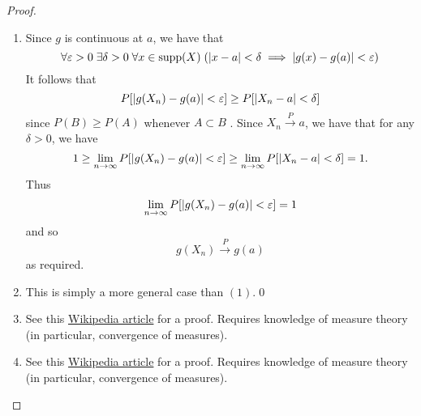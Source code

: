 \documentclass[notoc,notitlepage]{tufte-book}
\newcommand{\convp}{\overset{P}{\to}}
\begin{document}
\begin{proof}
  \begin{enumerate}
    \item Since $g$ is continuous at $a$, we have that
      \begin{equation*}
        \forall \varepsilon > 0 \; \exists \delta > 0 \; \forall x \in \operatorname{supp}(X) \; ( \left|x -a\right| < \delta \implies \left|g(x) - g(a)\right| < \varepsilon )
      \end{equation*}
      It follows that
      \begin{equation*}
        P[ \left| g(X_n ) - g(a)\right| < \varepsilon ] \geq P[ \left|X_n - a\right| < \delta ]
      \end{equation*}
      since $P(B) \geq P(A)$ whenever $A \subset B$ . Since $X_n \convp a$, we have that for any $\delta > 0$, we have
      \begin{equation*}
        1 \geq \lim_{n \to \infty} P[ \left|g(X_n) - g(a)\right| < \varepsilon ] \geq \lim_{n \to \infty} P[ \left|X_n - a\right| < \delta ] = 1.
      \end{equation*}
      Thus
      \begin{equation*}
        \lim_{n \to \infty} P[ \left|g(X_n) - g(a)\right| < \varepsilon ] = 1
      \end{equation*}
      and so
      \begin{equation*}
        g(X_n) \convp g(a)
      \end{equation*}
      as required.

    \item This is simply a more general case than $(1)$.\qed

    \item See this \href{https://en.wikipedia.org/wiki/Slutsky\'s_theorem}{Wikipedia article} for a proof. Requires knowledge of measure theory (in particular, convergence of measures).
      
    \item See this \href{https://en.wikipedia.org/wiki/Continuous_mapping_theorem}{Wikipedia article} for a proof. Requires knowledge of measure theory (in particular, convergence of measures).
  \end{enumerate}
\end{proof}
\end{document}

